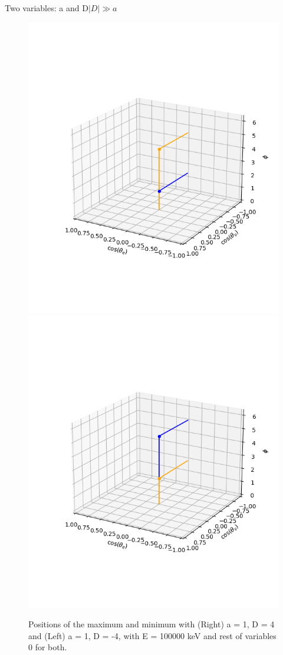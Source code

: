 \documentclass{beamer}
\begin{document}
\begin{frame}{Two variables: a and D}{$|D|\gg a$}
	\begin{figure}
		\centering
		\includegraphics[width=0.4\paperwidth]{plots/posa_xlposD_max_min}
		\includegraphics[width=0.4\paperwidth]{plots/posa_xlnegD_max_min}
		\caption{Positions of the maximum and minimum with (Right) a = 1, D = 4 and (Left) a = 1, D = -4, with E = 100000 keV and rest of variables 0 for both.}
	\end{figure}
\end{frame}
\end{document}

